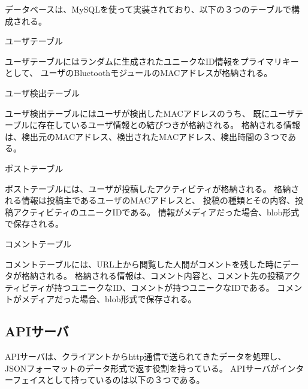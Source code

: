 データベースは、MySQLを使って実装されており、以下の３つのテーブルで構成される。

\begin{description}

\item{ユーザテーブル}

ユーザテーブルにはランダムに生成されたユニークなID情報をプライマリキーとして、
ユーザのBluetoothモジュールのMACアドレスが格納される。

\item{ユーザ検出テーブル}

ユーザ検出テーブルにはユーザが検出したMACアドレスのうち、
既にユーザテーブルに存在しているユーザ情報との結びつきが格納される。
格納される情報は、検出元のMACアドレス、検出されたMACアドレス、検出時間の３つである。

\item{ポストテーブル}

ポストテーブルには、ユーザが投稿したアクティビティが格納される。
格納される情報は投稿主であるユーザのMACアドレスと、
投稿の種類とその内容、投稿アクティビティのユニークIDである。
情報がメディアだった場合、blob形式で保存される。

\item{コメントテーブル}

コメントテーブルには、URL上から閲覧した人間がコメントを残した時にデータが格納される。
格納される情報は、コメント内容と、コメント先の投稿アクティビティが持つユニークなID、コメントが持つユニークなIDである。
コメントがメディアだった場合、blob形式で保存される。

\end{description}


\subsection{APIサーバ}

APIサーバは、クライアントからhttp通信で送られてきたデータを処理し、JSONフォーマットのデータ形式で返す役割を持っている。
APIサーバがインターフェイスとして持っているのは以下の３つである。

